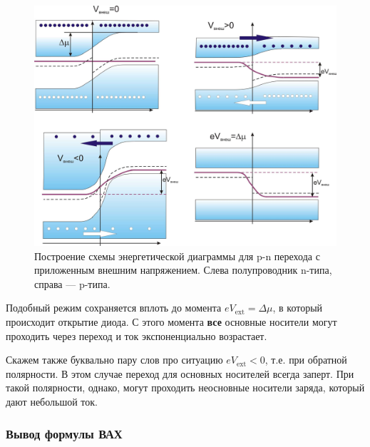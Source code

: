 \documentclass[a4paper, 12pt]{article}
\begin{document}
\begin{figure}[H]
	\centering
	\includegraphics[width=\linewidth]{2_schemes}
	\caption{Построение схемы энергетической диаграммы для p-n перехода с приложенным внешним напряжением. Слева полупроводник n-типа, справа --- p-типа.}
	\label{fig:2_schemes}
\end{figure}

Подобный режим сохраняется вплоть до момента $e V_{\text{ext}} = \Delta \mu$, в который происходит открытие диода. С этого момента \textbf{все} основные носители могут проходить через переход и ток экспоненциально возрастает.

Скажем также буквально пару слов про ситуацию $e V_{\text{ext}} < 0$, т.е. при обратной полярности. В этом случае переход для основных носителей всегда заперт. При такой полярности, однако, могут проходить неосновные носители заряда, который дают небольшой ток.


\subsubsection{Вывод формулы ВАХ}
\end{document}
